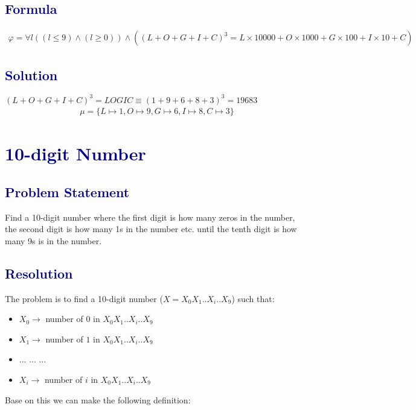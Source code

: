 \documentclass[12pt]{article}
\theoremstyle{definition}
\theoremstyle{plain}
\begin{document}
\subsection*{\textcolor{darkblue}{Formula}}

\begin{align}
  \varphi =\forall l\left((l \leq 9)\wedge (l \geq 0) \right) \wedge \left((L + O + G + I + C)^3 = L\times 10000 + O \times 1000 + G \times 100 + I\times 10 + C\right)
\end{align}

\subsection*{\textcolor{darkblue}{Solution}}
$(L + O + G + I + C)^3 = LOGIC \equiv (1+9+6+8+3)^3 = 19683$
\[
\boxed{\begin{aligned}
\mu = \{L \mapsto 1, O \mapsto 9, G \mapsto 6, I \mapsto 8, C \mapsto 3\}
\end{aligned}}
\]

\section*{\textcolor{darkblue}{10-digit Number}}
\subsection*{\textcolor{darkblue}{Problem Statement}}

\vspace{0.5cm}
\begin{tcolorbox}[colback=lightgray, colframe=darkblue, boxrule=1pt]
Find a 10-digit number where the first digit is how many zeros in the number, the second digit is how many 1s in the number etc. until the tenth digit is how many 9s is in the number.
\end{tcolorbox}

\subsection*{\textcolor{darkblue}{Resolution}}
The problem is to find a 10-digit number ($X = X_0X_1..X_i..X_9$) such that:
\begin{itemize}
  \item $X_0 \rightarrow$ number of $0$ in $X_0X_1..X_i..X_9$
  \item $X_1 \rightarrow$ number of $1$ in  $X_0X_1..X_i..X_9$
  \item ... ... ...
  \item$X_i \rightarrow$ number of $i$ in $X_0X_1..X_i..X_9$
\end{itemize}
Base on this we can make the following definition:
\end{document}
